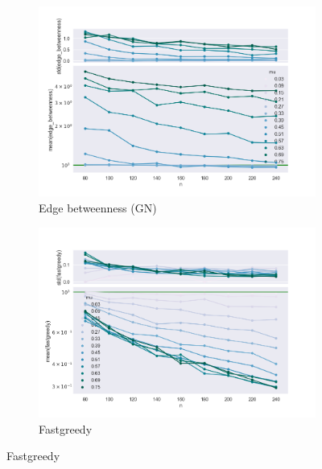 \begin{figure}
	\centering

    \begin{subfigure}[b]{0.32\textwidth}
        \includegraphics[width=\textwidth]{fig/ratio_vs_n_edge_betweenness}
        \caption{Edge betweenness (GN)}
        \label{fig:gull}
    \end{subfigure}
    \qquad
    \begin{subfigure}[b]{0.32\textwidth}
        \includegraphics[width=\textwidth]{fig/ratio_vs_n_fastgreedy}
        \caption{Fastgreedy}
        \label{fig:tiger}
    \end{subfigure}
    

\end{figure}
